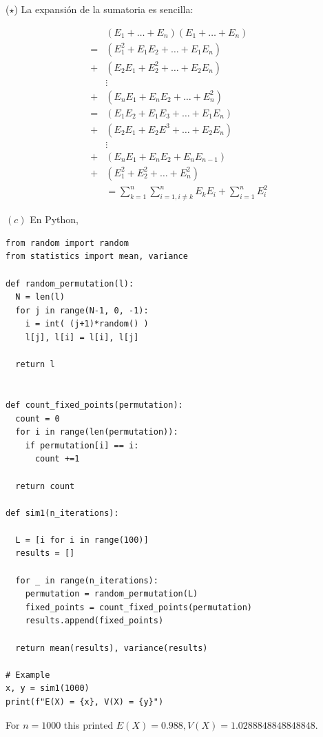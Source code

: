 \documentclass[a4paper, 12pt]{article}
\begin{document}
\begin{helpframe}
\small
  ($\star$) La expansión de la sumatoria es sencilla: 

  \begin{align*}
    &(E_1 + \ldots + E_n)(E_1 + \ldots + E_n) \\
    =& (E_1^2 + E_1E_2 + \ldots + E_1E_n) \\ 
    +&(E_2E_1 + E_2^2 + \ldots + E_2 E_n)\\
     &\vdots \\ 
    +&(E_nE_1 + E_nE_2 + \ldots + E_n^2) \\ 
    =& (E_1E_2 + E_1E_3 + \ldots + E_1E_n) \\ 
    +&(E_2E_1 + E_2E^3 + \ldots + E_2 E_n) \\
     &\vdots \\ 
    +&(E_nE_1 + E_nE_2 + E_nE_{n-1}) \\ 
    +&(E_1^2 + E_2^2 + \ldots +E_n^2) \\ 
     &=\sum_{k=1}^n\sum_{i=1, i \neq k}^n E_kE_i + \sum_{i=1}^n E_i^2
  \end{align*}
\end{helpframe}
\normalsize

\pagebreak 

$(c)$ En Python, 

\small
\begin{verbatim}
from random import random
from statistics import mean, variance

def random_permutation(l):
  N = len(l)
  for j in range(N-1, 0, -1):
    i = int( (j+1)*random() )
    l[j], l[i] = l[i], l[j]

  return l


def count_fixed_points(permutation):
  count = 0
  for i in range(len(permutation)):
    if permutation[i] == i:
      count +=1

  return count

def sim1(n_iterations):

  L = [i for i in range(100)]
  results = []

  for _ in range(n_iterations):
    permutation = random_permutation(L)
    fixed_points = count_fixed_points(permutation)
    results.append(fixed_points)

  return mean(results), variance(results)

# Example
x, y = sim1(1000)
print(f"E(X) = {x}, V(X) = {y}")
\end{verbatim}

\normalsize
For $n = 1000$ this printed $E(X) = 0.988, V(X) = 1.0288848848848848$.
\end{document}
